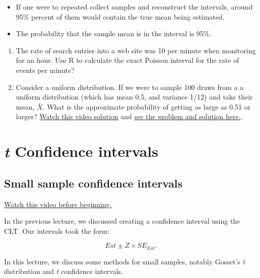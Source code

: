 \documentclass[]{article}
\begin{document}
\begin{itemize}
\itemsep1pt\parskip0pt
\item
  If one were to repeated collect samples and reconstruct the intervals,
  around 95\% percent of them would contain the true mean being
  estimated.
\item
  The probability that the sample mean is in the interval is 95\%.
\end{itemize}

\begin{enumerate}
\def\labelenumi{\arabic{enumi}.}
\setcounter{enumi}{4}
\itemsep1pt\parskip0pt
\item
  The rate of search entries into a web site was 10 per minute when
  monitoring for an hour. Use R to calculate the exact Poisson interval
  for the rate of events per minute?
\item
  Consider a uniform distribution. If we were to sample 100 draws from a
  a uniform distribution (which has mean 0.5, and variance 1/12) and
  take their mean, $\bar X$. What is the approximate probability of
  getting as large as 0.51 or larger?
  \href{https://www.youtube.com/watch?v=JsiLK0g3IZ4\&index=15\&list=PLpl-gQkQivXhHOcVeU3bSJg78zaDYbP9L}{Watch
  this video solution} and
  \href{http://bcaffo.github.io/courses/06_StatisticalInference/homework/hw2.html\#9}{see
  the problem and solution here.}.
\end{enumerate}

\newpage

\section{\emph{t} Confidence intervals}\label{t-confidence-intervals}

\subsection{Small sample confidence
intervals}\label{small-sample-confidence-intervals}

\href{http://youtu.be/pHXrDMjzyYg?list=PLpl-gQkQivXiBmGyzLrUjzsblmQsLtkzJ}{Watch
this video before beginning.}

In the previous lecture, we discussed creating a confidence interval
using the CLT. Our intervals took the form:

\[Est \pm Z \times SE_{Est}.\]

In this lecture, we discuss some methods for small samples, notably
Gosset's \emph{t} distribution and \emph{t} confidence intervals.
\end{document}
